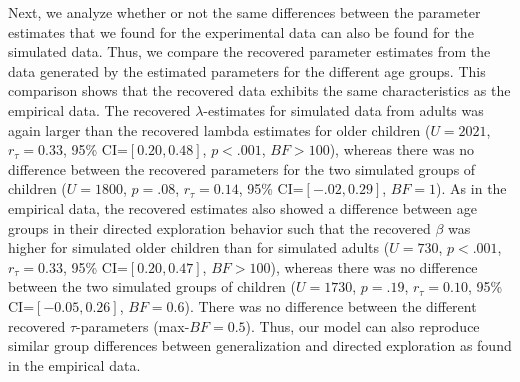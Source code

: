 Next, we analyze whether or not the same differences between the parameter estimates that we found for the experimental data can also be found for the simulated data. Thus, we compare the recovered parameter estimates from the data generated by the estimated parameters for the different age groups. This comparison shows that the recovered data exhibits the same characteristics as the empirical data. The recovered $\lambda$-estimates for simulated data from adults was again larger than the recovered lambda estimates for older children ($U=2021$, $r_\tau=0.33$, 95\% CI=$[0.20,0.48]$, $p<.001$, $BF>100$), whereas there was no difference between the recovered parameters for the two simulated groups of children ($U=1800$, $p=.08$, $r_\tau=0.14$, 95\% CI=$[-.02,0.29]$, $BF=1$). As in the empirical data, the recovered estimates also showed a difference between age groups in their directed exploration behavior such that the recovered $\beta$ was higher for simulated older children than for simulated adults ($U=730$, $p<.001$, $r_\tau=0.33$, 95\% CI=$[0.20,0.47]$, $BF>100$), whereas there was no difference between the two simulated groups of children ($U = 1730$, $p=.19$, $r_\tau= 0.10$, 95\% CI=$[-0.05,0.26]$, $BF=0.6$). There was no difference between the different recovered $\tau$-parameters (max-$BF=0.5$). Thus, our model can also reproduce similar group differences between generalization and directed exploration as found in the empirical data.

